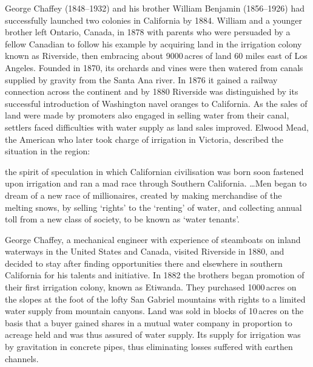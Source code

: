 George Chaffey (1848--1932) and his brother William Benjamin
(1856--1926) had successfully laun\-ch\-ed two colonies in California
by 1884.  William and a younger brother left Ontario, Canada, in 1878
with parents who were persuaded by a fellow Canadian to follow his
example by acquiring land in the irrigation colony known as Riverside,
then embracing about 9000\,acres of land 60 miles east of Los
Angeles.  Founded in 1870, its orchards and vines
were then watered from canals supplied by gravity from the Santa Ana
river.  In 1876 it gained a railway connection across the continent
and by 1880 Riverside was distinguished by its successful introduction
of Washington navel oranges to California.
As the sales of land were made by promoters also engaged in selling
water from their canal, settlers faced difficulties with water supply
as land sales improved.  Elwood Mead,  the American
who later took charge of irrigation in Victoria, described the
situation in the region:
\begin{Quote}
	the spirit of speculation in which Californian civilisation
	was born soon fastened upon irrigation and ran a mad race
	through Southern California. \ldots Men began to dream of a new
	race of millionaires, created by making merchandise of the
	melting snows, by selling `rights' to the `renting' of water,
	and collecting annual toll from a new class of society, to be
	known as `water tenants'.
\end{Quote}

George Chaffey,  a mechanical engineer with
experience of steamboats on inland waterways in the United States and
Canada, visited Riverside in 1880, and decided to stay after finding
opportunities there and elsewhere in southern California for his
talents and initiative.  In 1882 the brothers began promotion of their
first irrigation colony, known as
Etiwanda.  They purchased
1000\,acres on the slopes at the foot of the lofty San Gabriel
mountains with rights to a limited water supply from mountain canyons.
Land was sold in blocks of 10\,acres on the basis that a buyer gained
shares in a mutual water company in proportion to acreage held and was
thus assured of water supply.  Its supply for irrigation was by
gravitation in concrete pipes, thus eliminating losses suffered with
earthen channels.


